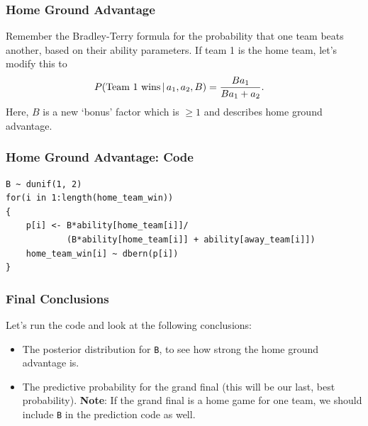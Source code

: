 \documentclass{beamer}
\newcommand{\given}{\,|\,}
\begin{document}
\begin{frame}
\frametitle{Home Ground Advantage}
Remember the Bradley-Terry formula for the probability that one team beats
another, based on their ability parameters. If team 1 is the home team, let's
modify this to
\begin{align}
P(\textnormal{Team 1 wins} \given a_1, a_2, B)
    &= \frac{B a_1}{Ba_1 + a_2}.
\end{align}
\pause
Here, $B$ is a new `bonus' factor which is $\geq 1$ and describes home
ground advantage.


\end{frame}


\begin{frame}[fragile]
\frametitle{Home Ground Advantage: Code}
\footnotesize
\begin{verbatim}
B ~ dunif(1, 2)
for(i in 1:length(home_team_win))
{
    p[i] <- B*ability[home_team[i]]/
            (B*ability[home_team[i]] + ability[away_team[i]])
    home_team_win[i] ~ dbern(p[i])
}
\end{verbatim}


\end{frame}


\begin{frame}[fragile]
\frametitle{Final Conclusions}
Let's run the code and look at the following conclusions:

\begin{itemize}
\item The posterior distribution for \texttt{B}, to see how strong
the home ground advantage is.
\item The predictive probability for the grand final (this will be our
last, best probability). {\bf Note}: If the grand final is a home game for
one team, we should include \texttt{B} in the prediction code as well.
\end{itemize}

\end{frame}
\end{document}
